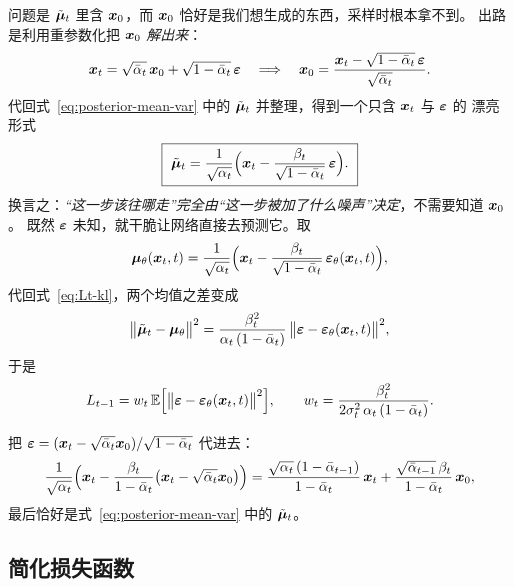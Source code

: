 问题是 $\tilde{\bm{\mu}}_t$ 里含 $\bm{x}_0$，而 $\bm{x}_0$ 恰好是我们想生成的东西，采样时根本拿不到。
出路是利用重参数化把 $\bm{x}_0$ \emph{解出来}：
\begin{equation}
  \bm{x}_t=\sqrt{\bar{\alpha}_t}\,\bm{x}_0+\sqrt{1-\bar{\alpha}_t}\,\bm{\varepsilon}
  \quad\Longrightarrow\quad
  \bm{x}_0=\frac{\bm{x}_t-\sqrt{1-\bar{\alpha}_t}\,\bm{\varepsilon}}{\sqrt{\bar{\alpha}_t}} .
  \label{eq:x0-from-eps}
\end{equation}
代回式~\eqref{eq:posterior-mean-var} 中的 $\tilde{\bm{\mu}}_t$ 并整理，得到一个只含 $\bm{x}_t$ 与 $\bm{\varepsilon}$ 的
漂亮形式
\begin{equation}
  \boxed{\ \tilde{\bm{\mu}}_t=\frac{1}{\sqrt{\alpha_t}}
    \Bigl(\bm{x}_t-\frac{\beta_t}{\sqrt{1-\bar{\alpha}_t}}\,\bm{\varepsilon}\Bigr).\ }
  \label{eq:mu-from-eps}
\end{equation}
换言之：\emph{“这一步该往哪走”完全由“这一步被加了什么噪声”决定}，不需要知道 $\bm{x}_0$。
既然 $\bm{\varepsilon}$ 未知，就干脆让网络直接去预测它。取
\begin{equation}
  \bm{\mu}_\theta(\bm{x}_t,t)=\frac{1}{\sqrt{\alpha_t}}
  \Bigl(\bm{x}_t-\frac{\beta_t}{\sqrt{1-\bar{\alpha}_t}}\,\bm{\varepsilon}_\theta(\bm{x}_t,t)\Bigr),
  \label{eq:mu-theta}
\end{equation}
代回式~\eqref{eq:Lt-kl}，两个均值之差变成
\begin{equation}
  \bigl\|\tilde{\bm{\mu}}_t-\bm{\mu}_\theta\bigr\|^2
  =\frac{\beta_t^2}{\alpha_t\,(1-\bar{\alpha}_t)}\,\bigl\|\bm{\varepsilon}-\bm{\varepsilon}_\theta(\bm{x}_t,t)\bigr\|^2 ,
  \label{eq:mean-diff}
\end{equation}
于是
\begin{equation}
  L_{t-1}=w_t\,\mathbb{E}\Bigl[\bigl\|\bm{\varepsilon}-\bm{\varepsilon}_\theta(\bm{x}_t,t)\bigr\|^2\Bigr],
  \qquad
  w_t=\frac{\beta_t^2}{2\sigma_t^2\,\alpha_t\,(1-\bar{\alpha}_t)} .
  \label{eq:Lt-weighted}
\end{equation}

\begin{remark}
把 $\bm{\varepsilon}=(\bm{x}_t-\sqrt{\bar{\alpha}_t}\bm{x}_0)/\sqrt{1-\bar{\alpha}_t}$ 代进去：
\begin{equation}
  \frac{1}{\sqrt{\alpha_t}}\Bigl(\bm{x}_t-\frac{\beta_t}{1-\bar{\alpha}_t}\bigl(\bm{x}_t-\sqrt{\bar{\alpha}_t}\bm{x}_0\bigr)\Bigr)
  =\frac{\sqrt{\alpha_t}\,(1-\bar\alpha_{t-1})}{1-\bar{\alpha}_t}\,\bm{x}_t
   +\frac{\sqrt{\bar\alpha_{t-1}}\,\beta_t}{1-\bar{\alpha}_t}\,\bm{x}_0 ,
\end{equation}
最后恰好是式~\eqref{eq:posterior-mean-var} 中的 $\tilde{\bm{\mu}}_t$。
\end{remark}

\subsection{简化损失函数}

